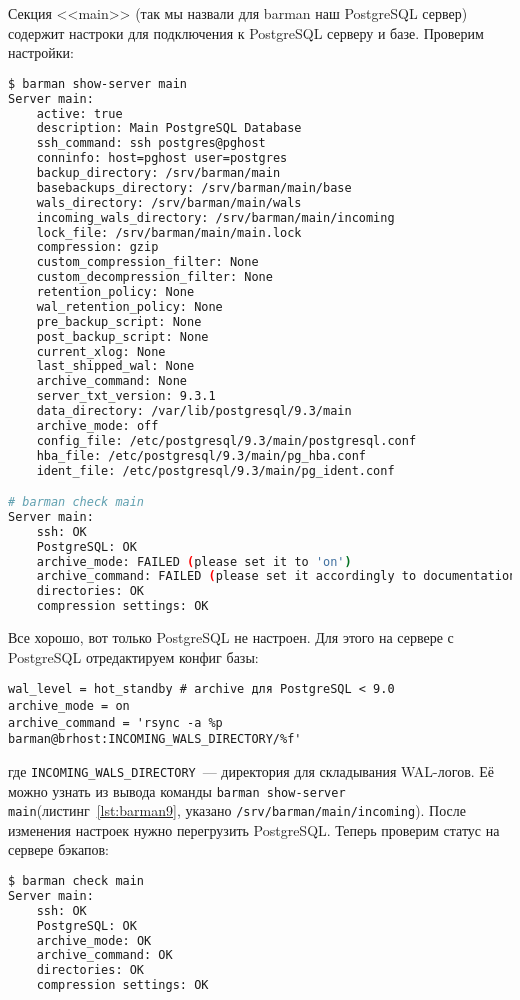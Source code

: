 Секция <<main>> (так мы назвали для barman наш PostgreSQL сервер) содержит настроки для подключения к PostgreSQL серверу и базе. Проверим настройки:

\begin{lstlisting}[language=Bash,label=lst:barman9,caption=Проверка barman настроек]
$ barman show-server main
Server main:
	active: true
	description: Main PostgreSQL Database
	ssh_command: ssh postgres@pghost
	conninfo: host=pghost user=postgres
	backup_directory: /srv/barman/main
	basebackups_directory: /srv/barman/main/base
	wals_directory: /srv/barman/main/wals
	incoming_wals_directory: /srv/barman/main/incoming
	lock_file: /srv/barman/main/main.lock
	compression: gzip
	custom_compression_filter: None
	custom_decompression_filter: None
	retention_policy: None
	wal_retention_policy: None
	pre_backup_script: None
	post_backup_script: None
	current_xlog: None
	last_shipped_wal: None
	archive_command: None
	server_txt_version: 9.3.1
	data_directory: /var/lib/postgresql/9.3/main
	archive_mode: off
	config_file: /etc/postgresql/9.3/main/postgresql.conf
	hba_file: /etc/postgresql/9.3/main/pg_hba.conf
	ident_file: /etc/postgresql/9.3/main/pg_ident.conf

# barman check main
Server main:
	ssh: OK
	PostgreSQL: OK
	archive_mode: FAILED (please set it to 'on')
	archive_command: FAILED (please set it accordingly to documentation)
	directories: OK
	compression settings: OK
\end{lstlisting}

Все хорошо, вот только PostgreSQL не настроен. Для этого на сервере с PostgreSQL отредактируем конфиг базы:

\begin{lstlisting}[label=lst:barman10,caption=Настройка PostgreSQL]
wal_level = hot_standby # archive для PostgreSQL < 9.0
archive_mode = on
archive_command = 'rsync -a %p barman@brhost:INCOMING_WALS_DIRECTORY/%f'
\end{lstlisting}

где \lstinline!INCOMING_WALS_DIRECTORY!~--- директория для складывания WAL-логов. Её можно узнать из вывода команды \lstinline!barman show-server main!(листинг~\ref{lst:barman9},  указано \lstinline!/srv/barman/main/incoming!). После изменения настроек нужно перегрузить PostgreSQL. Теперь проверим статус на сервере бэкапов:

\begin{lstlisting}[language=Bash,label=lst:barman11,caption=Проверка]
$ barman check main
Server main:
	ssh: OK
	PostgreSQL: OK
	archive_mode: OK
	archive_command: OK
	directories: OK
	compression settings: OK
\end{lstlisting}

